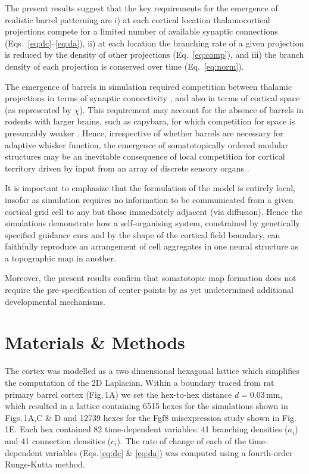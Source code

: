 \documentclass[9pt,lineno]{elife}
\begin{document}
The present results suggest that the key requirements for the emergence of
realistic barrel patterning are i) at each cortical location thalamocortical
projections compete for a limited number of available synaptic connections
(Eqs.~\ref{eq:dc}--\ref{eq:da}), ii) at each location the branching rate of a
given projection is reduced by the density of other projections
(Eq.~\ref{eq:comp}), and iii) the branch density of each projection is
conserved over time (Eq.~\ref{eq:norm}).

The emergence of barrels in simulation required competition between thalamic
projections in terms of synaptic connectivity , and also in terms of cortical space (as
represented by $\chi$). This requirement may account for the absence of
barrels in rodents with larger brains, such as capybara, for which competition
for space is presumably weaker \citep{woolsey_comparative_1975}. Hence,
irrespective of whether barrels are necessary for adaptive whisker function,
the emergence of somatotopically ordered modular structures may be an
inevitable consequence of local competition for cortical territory driven by
input from an array of discrete sensory organs \citep{purves_iterated_1992}.

It is important to emphasize that the formulation of the model is entirely
local, insofar as simulation requires no information to be communicated from a
given cortical grid cell to any but those immediately adjacent (via
diffusion). Hence the simulations demonstrate how a self-organising system,
constrained by genetically specified guidance cues and by the shape of the
cortical field boundary, can faithfully reproduce an arrangement of cell
aggregates in one neural structure as a topographic map in another.

Moreover, the present results confirm that somatotopic map formation does not
require the pre-specification of center-points by as yet undetermined
additional developmental mechanisms.

\section{Materials \& Methods}

%
%

The cortex was modelled as a two dimensional hexagonal lattice which
simplifies the computation of the 2D Laplacian. Within a boundary traced from
rat primary barrel cortex (Fig.\,1A) we set the hex-to-hex distance
$d=0.03$\,mm, which resulted in a lattice containing 6515 hexes for the
simulations shown in Figs.\,1A,C \& D and 12739 hexes for the Fgf8
misexpression study shown in Fig.\,1E. Each hex contained 82 time-dependent
variables: 41 branching densities ($a_i$) and 41 connection densities ($c_i$).
The rate of change of each of the time-dependent variables (Eqs.\,\ref{eq:dc}
\& \ref{eq:da}) was computed using a fourth-order Runge-Kutta method.
\end{document}
